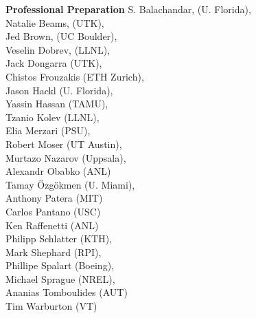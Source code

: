\documentclass[11pt,letterpaper,english]{article}
\begin{document}
\begin{flushleft} {\bf Professional Preparation}
{ S. Balachandar, (U. Florida), \\
 Natalie Beams, (UTK), \\
 Jed Brown, (UC Boulder), \\
 Veselin Dobrev, (LLNL), \\
 Jack Dongarra  (UTK), \\
 Chistos Frouzakis (ETH Zurich), \\
 Jason Hackl   (U. Florida),  \\
 Yassin Hassan (TAMU),  \\
 Tzanio Kolev (LLNL),  \\
 Elia Merzari (PSU), \\
 Robert Moser (UT Austin), \\
 Murtazo Nazarov (Uppsala), \\
Alexandr Obabko (ANL) \\
 Tamay \"Ozg\"okmen (U. Miami),  \\
Anthony Patera (MIT) \\
Carlos Pantano (USC) \\
Ken Raffenetti (ANL) \\
 Philipp Schlatter (KTH), \\
 Mark Shephard     (RPI), \\
 Phillipe Spalart (Boeing), \\
 Michael Sprague (NREL), \\
Ananias Tomboulides (AUT) \\
 Tim Warburton (VT) \\
 }


\end{flushleft}
\end{document}
